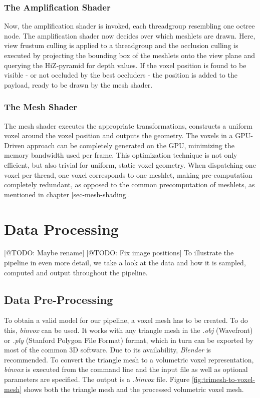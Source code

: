 \subsubsection*{The Amplification Shader} \label{subsec-amplification-shader}

Now, the amplification shader is invoked, each threadgroup resembling one octree node. The amplification 
shader now decides over which meshlets are drawn. Here, view frustum culling is applied to a threadgroup 
and the occlusion culling is executed by projecting the bounding box of the meshlets onto the view plane 
and querying the \ac{HiZ}-pyramid for depth values. If the voxel position is found to be visible - or not 
occluded by the best occluders - the position is added to the payload, ready to be drawn by the mesh shader. 


\subsubsection*{The Mesh Shader} \label{subsec-mesh-shader}

The mesh shader executes the appropriate transformations, constructs a uniform voxel around the voxel position 
and outputs the geometry. The voxels in a \ac{GPU}-Driven approach can be completely generated on the \ac{GPU}, 
minimizing the memory bandwidth used per frame. This optimization technique is not only efficient, but also 
trivial for uniform, static voxel geometry. When dispatching one voxel per thread, one voxel corresponds 
to one meshlet, making pre-computation completely redundant, as opposed to the common precomputation of meshlets, 
as mentioned in chapter \ref{sec-mesh-shading}. 


\section{Data Processing} \label{sec-data-flow}

[@TODO: Maybe rename] [@TODO: Fix image positions]
To illustrate the pipeline in even more detail, we take a look at the data and how it is sampled, computed 
and output throughout the pipeline. 

\subsection*{Data Pre-Processing}

To obtain a valid model for our pipeline, a voxel mesh has to be created. To do this, \emph{binvox} 
\cite{binvox} can be used. It works with any triangle mesh in the \emph{.obj} (Wavefront) or \emph{.ply} 
(Stanford Polygon File Format) format, which in turn can be exported by most of the common 3D software. 
Due to its availability, \emph{Blender} \cite{Blender} is recommended. To convert the triangle mesh to a volumetric 
voxel representation, \emph{binvox} is executed from the command line and the input file as well as optional 
parameters are specified. The output is a \emph{.binvox} file. Figure \ref{fig:trimesh-to-voxel-mesh} shows 
both the triangle mesh and the processed volumetric voxel mesh. 


